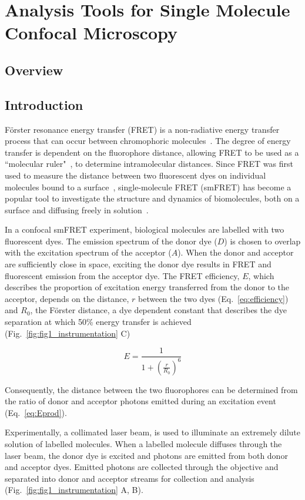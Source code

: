 \chapter{Analysis Tools for Single Molecule Confocal Microscopy}
\section{Overview}
\section{Introduction}
F\"{o}rster resonance energy transfer (FRET) is a non-radiative energy transfer process that can occur between chromophoric molecules~\cite{forster48}. The degree of energy transfer is dependent on the fluorophore distance, allowing FRET to be used as a ``molecular ruler"~\cite{stryer67}, to determine intramolecular distances. Since FRET was first used to measure the distance between two fluorescent dyes on individual molecules bound to a surface~\cite{ha96}, single-molecule FRET (smFRET) has become a popular tool to investigate the structure and dynamics of biomolecules, both on a surface and diffusing freely in solution~\cite{haran03, schuler02, weiss00}.

In a confocal smFRET experiment, biological molecules are labelled with two fluorescent dyes. The emission spectrum of the donor dye ($D$) is chosen to overlap with the excitation spectrum of the acceptor ($A$). When the donor and acceptor are sufficiently close in space, exciting the donor dye results in FRET and fluorescent emission from the acceptor dye. The FRET efficiency, $E$, which describes the proportion of excitation energy transferred from the donor to the acceptor, depends on the distance, $r$ between the two dyes (Eq.~\ref{eq:efficiency}) and $R_0$, the F\"{o}rster distance, a dye dependent constant that describes the dye separation at which 50\% energy transfer is achieved (Fig.~\ref{fig:fig1_instrumentation} C)

\begin{equation}
E = \frac{1}{1 + (\frac{r}{R_0})^6} 
\label{eq:efficiency}
\end{equation}

Consequently, the distance between the two fluorophores can be determined from the ratio of donor and acceptor photons emitted during an excitation event (Eq.~\ref{eq:Eprod}).

Experimentally, a collimated laser beam, is used to illuminate an extremely dilute solution of labelled molecules. When a labelled molecule diffuses through the laser beam, the donor dye is excited and photons are emitted from both donor and acceptor dyes.  Emitted photons are collected through the objective and separated into donor and acceptor streams for collection and analysis (Fig.~\ref{fig:fig1_instrumentation} A, B). 

